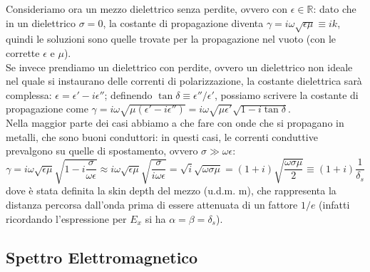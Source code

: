 %
Consideriamo ora un mezzo dielettrico senza perdite, ovvero con $ \epsilon\in\mathbb{R} $: dato che in un dielettrico $ \sigma = 0 $, la costante di propagazione diventa $ \gamma = i \omega \sqrt{\epsilon\mu} \equiv i k $, quindi le soluzioni sono quelle trovate per la propagazione nel vuoto (con le corrette $ \epsilon $ e $ \mu $). \\ 
Se invece prendiamo un dielettrico con perdite, ovvero un dielettrico non ideale nel quale si instaurano delle correnti di polarizzazione, la costante dielettrica sarà complessa: $ \epsilon = \epsilon' - i \epsilon'' $; definendo $ \tan\delta \equiv \epsilon'' / \epsilon' $, possiamo scrivere la costante di propagazione come $ \gamma = i \omega \sqrt{\mu(\epsilon' - i \epsilon'')} = i \omega \sqrt{\mu \epsilon'} \sqrt{1 - i \tan\delta} $. \\ 
%
Nella maggior parte dei casi abbiamo a che fare con onde che si propagano in metalli, che sono buoni conduttori: in questi casi, le correnti conduttive prevalgono su quelle di spostamento, ovvero $ \sigma \gg \omega\epsilon $:
\begin{equation}
	\gamma = i \omega \sqrt{\epsilon\mu} \sqrt{1 - i \frac{\sigma}{\omega\epsilon}} \approx i \omega \sqrt{\epsilon\mu} \sqrt{\frac{\sigma}{i \omega \epsilon}} = \sqrt{i} \sqrt{\omega\sigma\mu} = (1 + i) \sqrt{\frac{\omega\sigma\mu}{2}} \equiv (1 + i) \frac{1}{\delta_s}
	\label{eq:23}
\end{equation}
dove è stata definita la skin depth del mezzo (u.d.m. $ \text{m} $), che rappresenta la distanza percorsa dall'onda prima di essere attenuata di un fattore $ 1/e $ (infatti ricordando l'espressione per $ E_x $ si ha $ \alpha = \beta = \delta_s $).

\subsection{Spettro Elettromagnetico}


